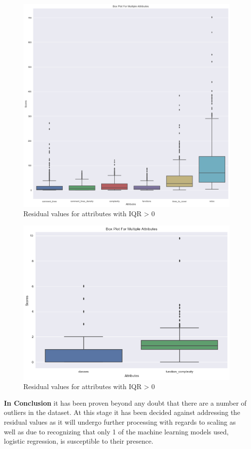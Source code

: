 \begin{figure}[!h]
    \centering
    \includegraphics[scale=0.45]{Figures/boxplot_iqr_above_0_part1.png}
    \caption{Residual values for attributes with IQR > 0}
    \label{fig:outliers:boxplot-iqr-above-0-part1}
\end{figure}

\begin{figure}[!h]
    \centering
    \includegraphics[scale=0.65]{Figures/boxplot_iqr_above_0_part2.png}
    \caption{Residual values for attributes with IQR > 0}
    \label{fig:outliers:boxplot-iqr-above-0-part2}
\end{figure}

\textbf{In Conclusion} it has been proven beyond any doubt that there are a number of outliers in the dataset. At this stage it has been decided against addressing the residual values as it will undergo further processing with regards to scaling as well as due to recognizing that only 1 of the machine learning models used, logistic regression, is susceptible to their presence. 
\FloatBarrier